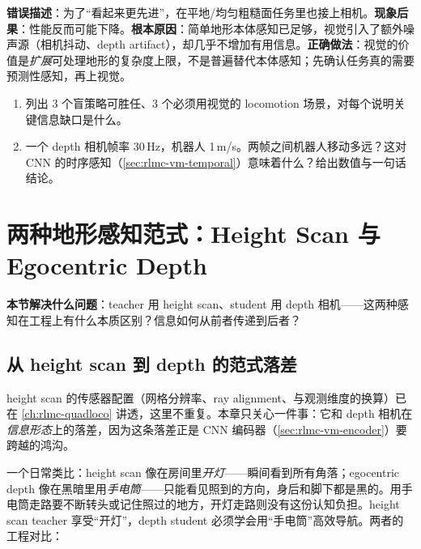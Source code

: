 \begin{pitfall}
\textbf{错误描述}：为了“看起来更先进”，在平地/均匀粗糙面任务里也接上相机。\textbf{现象后果}：性能反而可能下降。\textbf{根本原因}：简单地形本体感知已足够，视觉引入了额外噪声源（相机抖动、depth artifact），却几乎不增加有用信息。\textbf{正确做法}：视觉的价值是\emph{扩展}可处理地形的复杂度上限，不是普遍替代本体感知；先确认任务真的需要预测性感知，再上视觉。
\end{pitfall}

\begin{practice}[盲与视觉的边界]
\begin{enumerate}
\item 列出 3 个盲策略可胜任、3 个必须用视觉的 locomotion 场景，对每个说明关键信息缺口是什么。
\item 一个 depth 相机帧率 30\,Hz，机器人 1\,m/s。两帧之间机器人移动多远？这对 CNN 的时序感知（\cref{sec:rlmc-vm-temporal}）意味着什么？给出数值与一句话结论。
\end{enumerate}
\end{practice}

\section{两种地形感知范式：Height Scan 与 Egocentric Depth}
\label{sec:rlmc-vm-twoparadigm}

\textbf{本节解决什么问题}：teacher 用 height scan、student 用 depth 相机——这两种感知在工程上有什么本质区别？信息如何从前者传递到后者？

\subsection{从 height scan 到 depth 的范式落差}
\label{sec:rlmc-vm-paradigmgap}

height scan 的传感器配置（网格分辨率、ray alignment、与观测维度的换算）已在 \cref{ch:rlmc-quadloco} 讲透，这里不重复。本章只关心一件事：它和 depth 相机在\emph{信息形态}上的落差，因为这条落差正是 CNN 编码器（\cref{sec:rlmc-vm-encoder}）要跨越的鸿沟。

一个日常类比：height scan 像在房间里\emph{开灯}——瞬间看到所有角落；egocentric depth 像在黑暗里用\emph{手电筒}——只能看见照到的方向，身后和脚下都是黑的。用手电筒走路要不断转头或记住照过的地方，开灯走路则没有这份认知负担。height scan teacher 享受“开灯”，depth student 必须学会用“手电筒”高效导航。两者的工程对比：

